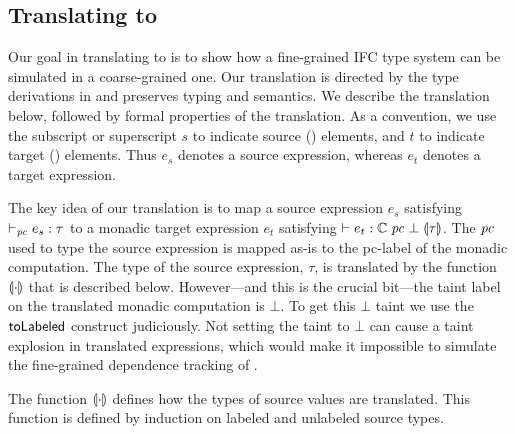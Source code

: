 \subsection{Translating {\fg} to {\cg}}
\label{sec:fg-2-cg}



Our goal in translating {\fg} to {\cg} is to show how a fine-grained
IFC type system can be simulated in a coarse-grained one. Our
translation is directed by the type derivations in {\fg} and preserves
typing and semantics. We describe the translation below, followed by
formal properties of the translation. As a convention, we use the
subscript or superscript $s$ to indicate source ({\fg}) elements, and
$t$ to indicate target ({\cg}) elements. Thus $e_s$ denotes a source
expression, whereas $e_t$ denotes a target expression.

The key idea of our translation is to map a source expression $e_s$
satisfying $\vdash_{\mathit{pc}} e_s: \tau$ to a monadic target expression
$e_t$ satisfying $\vdash e_t: \mathbb{C}\;\mathit{pc}\;\bot\;\llparenthesis \tau \rrparenthesis$. The
$\mathit{pc}$ used to type the source expression is mapped as-is to the
pc-label of the monadic computation. The type of the source
expression, $\tau$, is translated by the function $\llparenthesis \cdot \rrparenthesis$
that is described below. However---and this is the crucial bit---the
taint label on the translated monadic computation is $\bot$. To get
this $\bot$ taint we use the $\mathsf{toLabeled}$ construct judiciously. Not
setting the taint to $\bot$ can cause a taint explosion in translated
expressions, which would make it impossible to simulate the
fine-grained dependence tracking of {\fg}.

The function $\llparenthesis \cdot \rrparenthesis$ defines how the types of source values
are translated. This function is defined by induction on labeled and
unlabeled source types.

